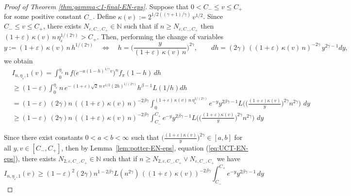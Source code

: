 \documentclass[preprint]{imsart}
\newcommand{\1}{\mathbf{1}}
\theoremstyle{plain}
\theoremstyle{definition}
\begin{document}
\begin{proof}[Proof of Theorem \ref{thm:gamma<1-final-EN-eps}]
Suppose that \(0<C_{-}\leq v\leq C_{+}\) for some positive constant \(C_{-}\). Define \(\kappa(v):=2^{1/2((\gamma+1)/\gamma)}\,v^{1/2}\). Since \(C_{-}\leq v\leq C_{+}\), there exists \(N_{\varepsilon,C_{-},C_{+}}\in \mathbb{N}\) such that if \(n\ge N_{\varepsilon,C_{-},C_{+}}\) then \((1+\varepsilon)\,\kappa(v)\,n\,\eta_{\varepsilon}^{1/(2\gamma)}>C_{+}\).
Then, performing the change of variables
\begin{equation*}
y:=(1+\varepsilon)\,\kappa(v)\,n\,h^{1/(2\gamma)}
\quad\Longleftrightarrow\quad
h=\Big(\frac{y}{(1+\varepsilon)\,\kappa(v)\,n}\Big)^{2\gamma},\qquad
dh=(2\gamma)\,((1+\varepsilon)\,\kappa(v)\,n)^{-2\gamma}\,y^{2\gamma-1}dy,
\end{equation*}
we obtain
\begin{equation*}
    \begin{split}
        &I_{n,\eta_{\varepsilon},1}(v)=\int_{0}^{\eta_{\varepsilon}} n\, f\!\big(e^{-a(1-h)^{1/\gamma}v}\big)^{n} f_\pi(1-h)\,dh\\
        &\geq (1-\varepsilon)\int_{0}^{\eta_{\varepsilon}} n\, e^{-\,(1+\varepsilon)\sqrt{2}\,n\,v^{1/2} (2h)^{1/(2\gamma)}}h^{\beta-1}L(1/h)dh\\
        &=(1-\varepsilon)\ (2\gamma)n\,((1+\varepsilon)\,\kappa(v)\,n)^{-2\beta\gamma}\int_{0}^{(1+\varepsilon)\,\kappa(v)\,n\,\eta_{\varepsilon}^{1/(2\gamma)}} e^{-y}y^{2\beta\gamma-1}L\Bigg(\Bigg(\frac{(1+\varepsilon)\kappa(v)}{y}\Bigg)^{2\gamma}n^{2\gamma}\Bigg)\, \,dy\\
        &\geq (1-\varepsilon)\ (2\gamma)n\,((1+\varepsilon)\,\kappa(v)\,n)^{-2\beta\gamma}\int_{C_{-}}^{C_{+}} e^{-y}y^{2\beta\gamma-1}L\Bigg(\Bigg(\frac{(1+\varepsilon)\kappa(v)}{y}\Bigg)^{2\gamma}n^{2\gamma}\Bigg)\, \,dy
    \end{split}
\end{equation*}

Since there exist constants \(0<a<b<\infty\) such that \(\Big(\frac{(1+\varepsilon)\kappa(v)}{y}\Big)^{2\gamma}\in [a,b]\) for all \(y,v\in[C_{-},C_{+}]\), then by Lemma~\ref{lem:potter-EN-eps}, equation (\ref{eq:UCT-EN-eps}), there exists \(N_{2,\varepsilon,C_{-},C_{+}}\in\mathbb{N}\) such that if \(n\ge N_{2,\varepsilon,C_{-},C_{+}}\vee N_{\varepsilon,C_{-},C_{+}}\) we have
\begin{equation}
    I_{n,\eta_{\varepsilon},1}(v)\geq (1-\varepsilon)^2(2\gamma)n^{1-2\beta\gamma}L(n^{2\gamma})\,((1+\varepsilon)\,\kappa(v))^{-2\beta\gamma}\int_{C_{-}}^{C_{+}} e^{-y}y^{2\beta\gamma-1} \,dy
\end{equation}


\end{proof}
\end{document}
